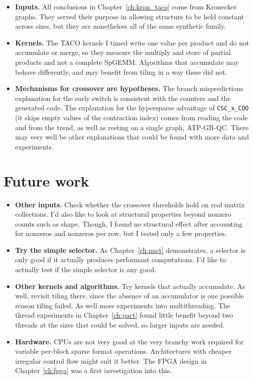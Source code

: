 \begin{itemize}
  \item \textbf{Inputs.} All conclusions in Chapter~\ref{ch:kron_taco} come from Kronecker graphs. They served their purpose in allowing structure to be held constant across sizes, but they are nonetheless all of the same synthetic family.
  \item \textbf{Kernels.} The TACO kernels I timed write one value per product and do not accumulate or merge, so they measure the multiply and store of partial products and not a complete SpGEMM. Algorithms that accumulate may behave differently, and may benefit from tiling in a way these did not.
  \item \textbf{Mechanisms for crossover are hypotheses.} The branch mispredictions explanation for the early switch  is consistent with the counters and the generated code. The explanation for the hypersparse advantage of \texttt{CSC\_x\_COO} (it skips empty values of the contraction index) comes from reading the code and from the trend, as well as resting on a single graph, ATP-GR-QC. There may very well be other explanations that could be found with more data and experiments.
\end{itemize}

\section{Future work}

\begin{itemize}
\item \textbf{Other inputs.} Check whether the crossover thresholds hold on real matrix collections. I'd also like to look at structural properties beyond nonzero counts such as shape. Though, I found no structural effect after accounting for nonzeros and nonzeros per row, but I tested only a few properties.

\item \textbf{Try the simple selector.} As Chapter~\ref{ch:pact} demonstrates, a selector is only good if it actually produces performant computations. I'd like
to actually test if the simple selector is any good.

\item \textbf{Other kernels and algorithms.} Try kernels that actually accumulate. As well, revisit tiling there, since the absence of an accumulator is one possible reason tiling failed. As well more experiments into multithreading. The thread experiments in Chapter~\ref{ch:pact} found little benefit beyond two threads at the sizes that could be solved, so larger inputs are needed.

\item \textbf{Hardware.} CPUs are not very good at the very branchy work required for variable per-block sparse format operations. Architectures with cheaper irregular control flow might suit it better. The FPGA design in Chapter~\ref{ch:fpga} was a first investigation into this.
\end{itemize}

